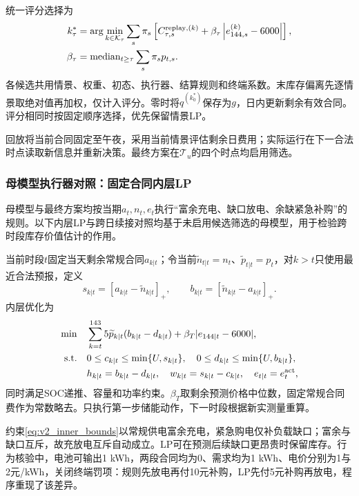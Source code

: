统一评分选择为
\begin{align}
 k_\tau^*&=\arg\min_{k\in\mathcal K_\tau}\sum_s\pi_s
 \left[C_{\tau,s}^{\mathrm{replay},(k)}
 +\beta_\tau\left|e_{144,s}^{(k)}-6000\right|\right],
 \label{eq:q3_candidate_score}\\
 \beta_\tau&=\operatorname{median}_{t\ge\tau}\sum_s\pi_sp_{t,s}.\notag
\end{align}
各候选共用情景、权重、初态、执行器、结算规则和终端系数。末库存偏离先逐情景取绝对值再加权，仅计入评分。零时将$q^{(k_0^*)}$保存为$g$，日内更新剩余有效合同。评分相同时按固定顺序选择，优先保留情景LP。

回放将当前合同固定至午夜，采用当前情景评估剩余日费用；实际运行在下一合法时点读取新信息并重新决策。最终方案在$\mathcal T_u$的四个时点均启用筛选。

\subsubsection{母模型执行器对照：固定合同内层LP}

母模型与最终方案均按当期$a_t,n_t,e_t$执行“富余充电、缺口放电、余缺紧急补购”的规则。以下内层LP与跨日续接对照均基于未启用候选筛选的母模型，用于检验跨时段库存价值估计的作用。

当前时段$t$固定当天剩余常规合同$a_{k|t}$；令当前$\widetilde n_{t|t}=n_t$、$\widetilde p_{t|t}=p_t$，对$k>t$只使用最近合法预报，定义
\begin{equation}
 s_{k|t}=[a_{k|t}-\widetilde n_{k|t}]_+,\qquad
 b_{k|t}=[\widetilde n_{k|t}-a_{k|t}]_+.
 \label{eq:v2_surplus_deficit}
\end{equation}
内层优化为
\begin{align}
 \min\quad&\sum_{k=t}^{143}5\widetilde p_{k|t}(b_{k|t}-d_{k|t})
       +\beta_T|e_{144|t}-6000|,\label{eq:v2_inner_objective}\\
 \text{s.t.}\quad&0\le c_{k|t}\le\min\{U,s_{k|t}\},\quad
 0\le d_{k|t}\le\min\{U,b_{k|t}\},\label{eq:v2_inner_bounds}\\
 &h_{k|t}=b_{k|t}-d_{k|t},\quad
 w_{k|t}=s_{k|t}-c_{k|t},\quad e_{t|t}=e_t^{\rm act},
 \label{eq:v2_inner_balance}
\end{align}
同时满足SOC递推、容量和功率约束。$\beta_T$取剩余预测价格中位数，固定常规合同费作为常数略去。只执行第一步储能动作，下一时段根据新实测量重算。

约束\eqref{eq:v2_inner_bounds}以常规供电富余充电，紧急购电仅补负载缺口；富余与缺口互斥，故充放电互斥自动成立。LP可在预测后续缺口更昂贵时保留库存。行为核验中，电池可输出1 kWh，两段合同均为0、需求均为1 kWh、电价分别为1与2元/kWh，关闭终端罚项：规则先放电再付10元补购，LP先付5元补购再放电，程序重现了该差异。

